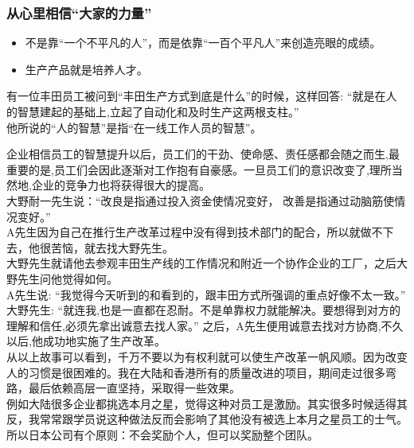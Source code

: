 \hypertarget{ux4eceux5fc3ux91ccux76f8ux4fe1ux5927ux5bb6ux7684ux529bux91cf}{%
\subsubsection{从心里相信``大家的力量''}\label{ux4eceux5fc3ux91ccux76f8ux4fe1ux5927ux5bb6ux7684ux529bux91cf}}

\begin{itemize}
\tightlist
\item
  不是靠``一个不平凡的人''，而是依靠``一百个平凡人''来创造亮眼的成绩。
\item
  生产产品就是培养人才。
\end{itemize}

\begin{description}
\tightlist
\item[]
有一位丰田员工被问到``丰田生产方式到底是什么''的时候，这样回答:
``就是在人的智慧建起的基础上,立起了自动化和及时生产这两根支柱。''\\

他所说的``人的智慧''是指``在一线工作人员的智慧''。\\
\end{description}


企业相信员工的智慧提升以后，员工们的干劲、使命感、责任感都会随之而生,最重要的是,员工们会因此逐渐对工作抱有自豪感。一旦员工们的意识改变了,理所当然地,企业的竞争力也将获得很大的提高。\\
大野耐一先生说：``改良是指通过投入资金使情况变好，
改善是指通过动脑筋使情况变好。''\\
A先生因为自己在推行生产改革过程中没有得到技术部门的配合，所以就做不下去，他很苦恼，就去找大野先生。\\
大野先生就请他去参观丰田生产线的工作情况和附近一个协作企业的工厂，之后大野先生问他觉得如何。\\
A先生说:
``我觉得今天听到的和看到的，跟丰田方式所强调的重点好像不太一致。''\\
大野先生:
``就连我,也是一直都在忍耐。不是单靠权力就能解决。要想得到对方的理解和信任,必须先拿出诚意去找人家。''
之后，A先生便用诚意去找对方协商,不久以后,他成功地实施了生产改革。\\
从以上故事可以看到，千万不要以为有权利就可以使生产改革一帆风顺。因为改变人的习惯是很困难的。我在大陆和香港所有的质量改进的项目，期间走过很多弯路，最后依赖高层一直坚持，采取得一些效果。\\
例如大陆很多企业都挑选本月之星，觉得这种对员工是激励。其实很多时候适得其反，我常常跟学员说这种做法反而会影响了其他没有被选上本月之星员工的士气。\\
所以日本公司有个原则：不会奖励个人，但可以奖励整个团队。\\

